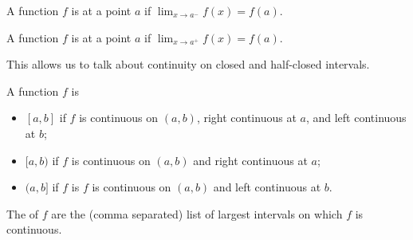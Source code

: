 \documentclass{ximera}
\begin{document}
\begin{definition}
  A function $f$ is  at a point $a$ if
  $\lim_{x\to a^-} f(x) = f(a)$.

  A function $f$ is  at a point $a$ if
  $\lim_{x\to a^+} f(x) = f(a)$.
\end{definition}

 This allows us to talk about continuity on closed and half-closed intervals.


\begin{definition}
  A function $f$ is
  \begin{itemize}
    \item {} $[a,b]$ if $f$ is
      continuous on $(a,b)$, right continuous at $a$, and left
      continuous at $b$;
    \item {} $[a,b)$ if $f$ is
      continuous on $(a,b)$ and right continuous at $a$;
    \item {} $(a,b]$ if $f$ is
      $f$ is continuous on $(a,b)$ and left continuous at $b$.
  \end{itemize}
  The  of $f$ are the (comma separated) list of largest intervals on which $f$ is continuous.
\end{definition}
\end{document}

